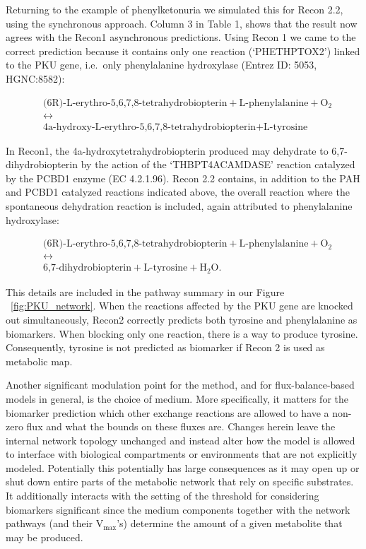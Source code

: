 \documentclass[10pt,a4paper,onecolumn]{article}
\begin{document}
Returning to the example of phenylketonuria we simulated this for Recon
2.2, using the synchronous approach. Column 3 in Table 1, shows that the
result now agrees with the Recon1 asynchronous predictions. Using Recon
1 we came to the correct prediction because it contains only one
reaction (`PHETHPTOX2') linked to the PKU gene, i.e.~only phenylalanine
hydroxylase (Entrez ID: 5053, HGNC:8582):

\begin{align*}
&\text{(6R)-L-erythro-5,6,7,8-tetrahydrobiopterin} + \text{L-phenylalanine} + \text{O}_2 \\
&\leftrightarrow \\
&\text{4a-hydroxy-L-erythro-5,6,7,8-tetrahydrobiopterin} + \text{L-tyrosine}
\end{align*}

In Recon1, the 4a-hydroxytetrahydrobiopterin produced may dehydrate to
6,7-dihydrobiopterin by the action of the `THBPT4ACAMDASE' reaction
catalyzed by the PCBD1 enzyme (EC 4.2.1.96). Recon 2.2 contains, in
addition to the PAH and PCBD1 catalyzed reactions indicated above, the
overall reaction where the spontaneous dehydration reaction is included,
again attributed to phenylalanine hydroxylase:

\begin{align*}
&\text{(6R)-L-erythro-5,6,7,8-tetrahydrobiopterin} + \text{L-phenylalanine} + \text{O}_2 \\
&\leftrightarrow \\
&\text{6,7-dihydrobiopterin} + \text{L-tyrosine} + \text{H}_2\text{O}.
\end{align*}

This details are included in the pathway summary in our Figure
~\ref{fig:PKU_network}. When the reactions affected by the PKU gene are
knocked out simultaneously, Recon2 correctly predicts both tyrosine and
phenylalanine as biomarkers. When blocking only one reaction, there is a
way to produce tyrosine. Consequently, tyrosine is not predicted as
biomarker if Recon 2 is used as metabolic map.

Another significant modulation point for the method, and for
flux-balance-based models in general, is the choice of medium. More
specifically, it matters for the biomarker prediction which other
exchange reactions are allowed to have a non-zero flux and what the
bounds on these fluxes are. Changes herein leave the internal network
topology unchanged and instead alter how the model is allowed to
interface with biological compartments or environments that are not
explicitly modeled. Potentially this potentially has large consequences
as it may open up or shut down entire parts of the metabolic network
that rely on specific substrates. It additionally interacts with the
setting of the threshold for considering biomarkers significant since
the medium components together with the network pathways (and their
V\(_{\text{max}}\)'s) determine the amount of a given metabolite that
may be produced.
\end{document}

